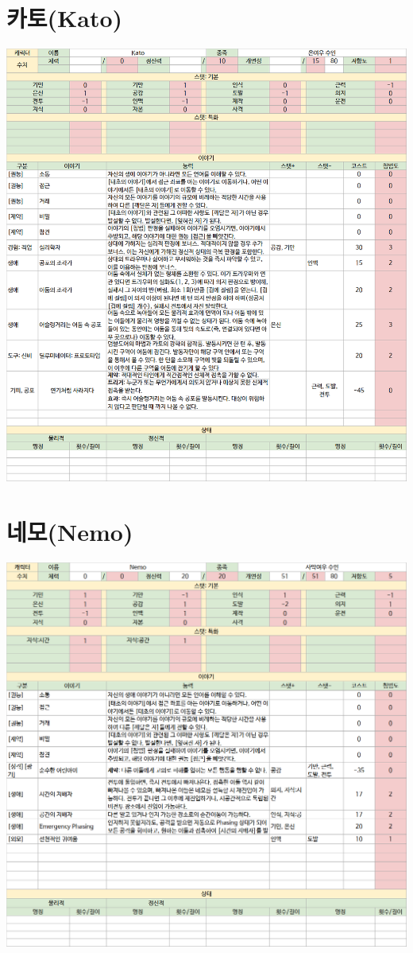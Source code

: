 \documentclass{report}
\begin{document}
	\section*{카토(Kato)}
		\includegraphics[width=\textwidth]{./Chapters/WoS/sheets/kato.png}
	
	\section*{네모(Nemo)}
		\includegraphics[width=\textwidth]{./Chapters/WoS/sheets/nemo.png}
	
\end{document}
